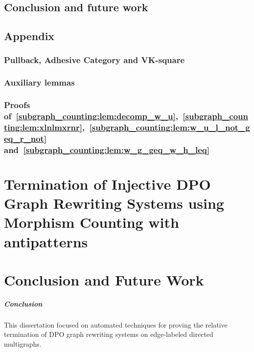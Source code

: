 \documentclass{report}
\begin{document}
\section{Conclusion and future work}
\label{subgraph_counting:sec:conclusion} 


\section{Appendix}
\subsection*{Pullback, Adhesive Category and VK-square}

\subsection*{Auxiliary lemmas}

\subsection*{Proofs of~\autoref{subgraph_counting:lem:decomp_w_u},~\autoref{subgraph_counting:lem:xlnlmxrnr},~\autoref{subgraph_counting:lem:w_u_l_not_geq_r_not} and~\autoref{subgraph_counting:lem:w_g_geq_w_h_leq}}
\label{subgraph_counting:sec:appendix:a}




\chapter{Termination of Injective DPO Graph Rewriting
Systems using Morphism Counting with antipatterns}
 

 
\chapter{Conclusion and Future Work}
\paragraph{Conclusion}
This dissertation focused on automated techniques for proving the relative termination of DPO graph rewriting systems on edge-labeled directed multigraphs.
\end{document}
